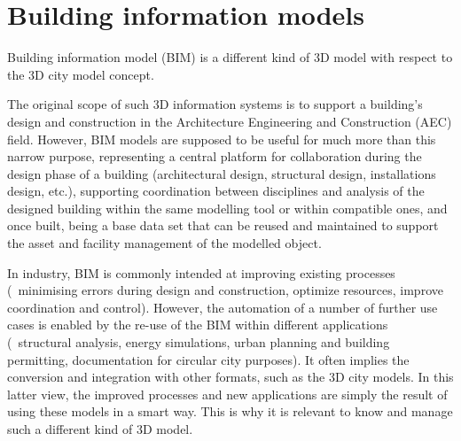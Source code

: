 
\setchapterpreamble[u]{\margintoc}

\graphicspath{{bim/}}
\renewcommand*{\thelesson}{6.2}

\chapter{Building information models}%
\label{chap:bim}


Building information model (BIM) is a different kind of 3D model with respect to the 3D city model concept.



The original scope of such 3D information systems is to support a building's design and construction in the Architecture Engineering and Construction (AEC) field.
However, BIM models are supposed to be useful for much more than this narrow purpose, representing a central platform for collaboration during the design phase of a building (architectural design, structural design, installations design, etc.), supporting coordination between disciplines and analysis of the designed building within the same modelling tool or within compatible ones, and once built, being a base data set that can be reused and maintained to support the asset and facility management of the modelled object.

In industry, BIM is commonly intended at improving existing processes (\eg\ minimising errors during design and construction, optimize resources, improve coordination and control). %
However, the automation of a number of further use cases is enabled by the re-use of the BIM within different applications (\eg\ structural analysis, energy simulations, urban planning and building permitting, documentation for circular city purposes).
It often implies the conversion and integration with other formats, such as the 3D city models.
In this latter view, the improved processes and new applications are simply the result of using these models in a smart way.
This is why it is relevant to know and manage such a different kind of 3D model.



